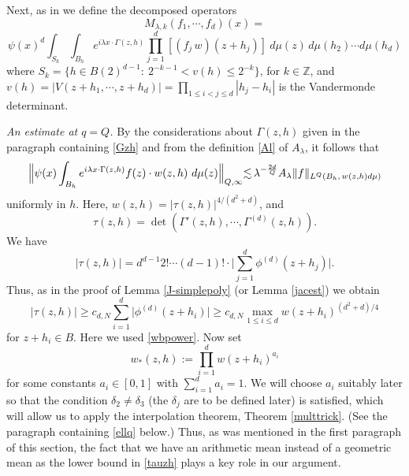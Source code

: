 \documentclass[11 pt]{amsart}
\theoremstyle{plain}
\numberwithin{equation}{section}
\theoremstyle{plain}
\numberwithin{equation}{section}
\theoremstyle{remark}
\begin{document}
Next, as in \cite{BL} we define the decomposed operators
\begin{equation*}\label{}
M_{{\lambda}, k} (f_1, \cdots, f_d)(x) =
\end{equation*}
\begin{equation}\label{multint}
\psi(x)^d \int_{S_k} \int_{B_h} e^{i{\lambda} x\cdot
\Gamma(z,h)} \prod_{j=1}^d [(f_j \, w)(z+ h_j)]\ d\mu(z)\,
d\mu(h_2)\cdots d\mu(h_d)
\end{equation}
where $S_k = {\{h\in B(2)^{d-1}:\ 2^{-k-1} < v(h) \le 2^{-k} \}}$, for $k\in {{\mathbb {Z}}}$, and
$v(h) = |V(z+ h_1, \cdots, z+ h_d)| = \prod_{1\le i<j \le d} |h_j - h_i| $ is
the Vandermonde determinant.

\medskip

{\sl An estimate at $q=Q$.}
By the considerations about $\Gamma(z,h)$ given in the paragraph containing \eqref{Gzh} and from the definition \eqref{Al} of $A_{\lambda}$, it follows that
\begin{equation}\label{osest}
\Big\| \psi(x) \int_{B_h} e^{i{\lambda} x\cdot \Gamma(z,h)}
f(z) \cdot w(z,h) \ d\mu(z) \Big\|_{Q,\infty} {\lesssim} \, {\lambda}^{-
{2d\over Q}} A_{\lambda} \| f \|_{L^Q (B_h,\, w(z,h) d\mu )}
\end{equation}
uniformly in $h$. Here, $w(z,h) = |\tau(z,h)|^{4/(d^2+d)}$, and
\[ \tau(z,h) = \det(\Gamma'(z,h), \cdots ,\Gamma^{(d)}(z,h)) .\]
We have
\begin{equation*}\label{}
|\tau(z,h)|
= d^{d-1} 2!\cdots(d-1)! \cdot \Big| \sum_{j=1}^{d} \phi^{(d)}(z+h_j)\Big| .
\end{equation*}
Thus, as in the proof of Lemma \ref{J-simplepoly} (or Lemma \ref{jacest}) we obtain
\begin{equation}\label{tauzh}
 |\tau(z,h)| \ge c_{d,N} \sum_{i=1}^d \big|\phi^{(d)}(z+h_i)\big| \ge c_{d,N} \max_{1\leq i \leq d} w (z+ h_i)^{(d^2+d)/4}
\end{equation}
for $z+h_i \in B$. Here we used \eqref{wbpower}. Now set
\begin{equation*}\label{}
w_* (z,h) := \prod_{i=1}^d w(z+ h_i)^{a_i}
\end{equation*}
for some constants $a_i \in [0,1]$ with $\sum_{i=1}^d a_i =1$. We
will choose $a_i$ suitably later so that
the condition $\delta_2
\not= \delta_3$ (the $\delta_j$ are to be defined later) is satisfied, which will allow us to apply the interpolation theorem, Theorem \ref{multtrick}. (See the paragraph containing \eqref{ellq} below.)
Thus, as was mentioned in the first paragraph of this section, the fact that we have an arithmetic mean instead of a geometric mean as the lower bound in \eqref{tauzh} plays a key role in our argument.
\end{document}
